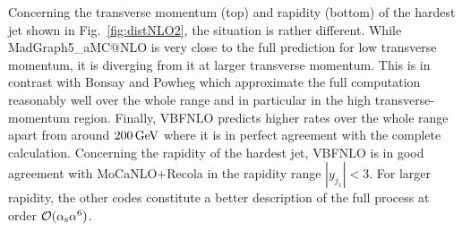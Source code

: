Concerning the transverse momentum (top) and rapidity (bottom) of the hardest jet shown in Fig.~\ref{fig:distNLO2}, the situation is rather different.
While {\sc MadGraph5\_aMC\-@NLO} is very close to the full prediction for low transverse momentum, it is diverging from it at larger transverse momentum.
This is in contrast with {\sc Bonsay} and {\sc Powheg} which approximate the full computation reasonably well over the whole range and in particular in the high transverse-momentum region.
Finally, {\sc VBFNLO} predicts higher rates over the whole range apart from around $200\,\text{GeV}$ where it is in perfect agreement with the complete calculation.
Concerning the rapidity of the hardest jet, {\sc VBFNLO} is in good agreement with {\sc MoCaNLO}+{\sc Recola} in the rapidity range $|y_{j_1}| < 3$.
For larger rapidity, the other codes constitute a better description of the full process at order $\mathcal{O}(\alpha_{\rm s}\alpha^6)$.

